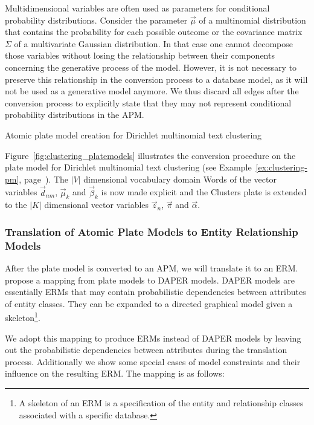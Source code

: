 Multidimensional variables are often used as parameters for conditional probability distributions. Consider the parameter $\vec \mu$ of a multinomial distribution that contains the probability for each possible outcome or the covariance matrix $\Sigma$ of a multivariate Gaussian distribution. In that case one cannot decompose those variables without losing the relationship between their components concerning the generative process of the model. However, it is not necessary to preserve this relationship in the conversion process to a database model, as it will not be used as a generative model anymore. We thus discard all edges after the conversion process to explicitly state that they may not represent conditional probability distributions in the APM.

\begin{Example} Atomic plate model creation for Dirichlet multinomial text clustering
\label{ex:clustering-apm}

Figure~\ref{fig:clustering_platemodels} illustrates the conversion procedure on the plate model for Dirichlet multinomial text clustering (see Example~\ref{ex:clustering-pm}, page~\pageref{ex:clustering-pm}). The $|V|$ dimensional vocabulary domain Words of the vector variables $\vec d_{nm}$, $\vec \mu_k$ and $\vec \beta_k$ is now made explicit and the Clusters plate is extended to the $|K|$ dimensional vector variables $\vec z_n$, $\vec \pi$ and $\vec \alpha$.

\end{Example}

\subsubsection{Translation of Atomic Plate Models to Entity Relationship Models}

After the plate model is converted to an APM, we will translate it to an ERM. \textcite{heckerman2007probabilistic} propose a mapping from plate models to DAPER models. DAPER models are essentially ERMs that may contain probabilistic dependencies between attributes of entity classes. They can be expanded to a directed graphical model given a skeleton\footnote{A skeleton of an ERM is a specification of the entity and relationship classes associated with a specific database.}.

We adopt this mapping to produce ERMs instead of DAPER models by leaving out the probabilistic dependencies between attributes during the translation process. Additionally we show some special cases of model constraints and their influence on the resulting ERM. The mapping is as follows:

